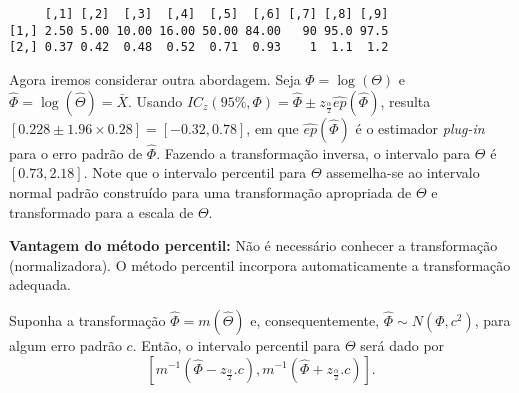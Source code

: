 \documentclass[
  letterpaper,
  DIV=11,
  numbers=noendperiod]{scrreprt}
\begin{document}
\begin{verbatim}
     [,1] [,2]  [,3]  [,4]  [,5]  [,6] [,7] [,8] [,9]
[1,] 2.50 5.00 10.00 16.00 50.00 84.00   90 95.0 97.5
[2,] 0.37 0.42  0.48  0.52  0.71  0.93    1  1.1  1.2
\end{verbatim}

Agora iremos considerar outra abordagem. Seja \(\Phi=\log(\Theta)\) e
\(\hat\Phi=\log(\hat\Theta)=\bar{X}\). Usando
\(IC_z\left(95\%,\Phi \right)= \hat{\Phi} \pm z_{\frac{\alpha}{2}}\hat{ep}(\hat{\Phi})\),
resulta
\(\left[ 0.228 \pm 1.96 \times 0.28 \right]=\left[-0.32, 0.78\right]\),
em que \(\hat{ep}(\hat{\Phi})\) é o estimador \textit{plug-in} para o
erro padrão de \(\hat\Phi\). Fazendo a transformação inversa, o
intervalo para \(\Theta\) é \(\left[0.73, 2.18\right]\). Note que o
intervalo percentil para \(\Theta\) assemelha-se ao intervalo normal
padrão construído para uma transformação apropriada de \(\Theta\) e
transformado para a escala de \(\Theta\).

\begin{tcolorbox}[enhanced jigsaw, coltitle=black, bottomtitle=1mm, toprule=.15mm, arc=.35mm, colframe=quarto-callout-important-color-frame, breakable, opacityback=0, bottomrule=.15mm, rightrule=.15mm, titlerule=0mm, toptitle=1mm, title=\textcolor{quarto-callout-important-color}{\faExclamation}\hspace{0.5em}{Importante}, leftrule=.75mm, opacitybacktitle=0.6, left=2mm, colback=white, colbacktitle=quarto-callout-important-color!10!white]

\textbf{Vantagem do método percentil:} Não é necessário conhecer a
transformação (normalizadora). O método percentil incorpora
automaticamente a transformação adequada.

\end{tcolorbox}

\begin{tcolorbox}[enhanced jigsaw, coltitle=black, bottomtitle=1mm, toprule=.15mm, arc=.35mm, colframe=quarto-callout-caution-color-frame, breakable, opacityback=0, bottomrule=.15mm, rightrule=.15mm, titlerule=0mm, toptitle=1mm, title=\textcolor{quarto-callout-caution-color}{\faFire}\hspace{0.5em}{Lema}, leftrule=.75mm, opacitybacktitle=0.6, left=2mm, colback=white, colbacktitle=quarto-callout-caution-color!10!white]

Suponha a transformação \(\hat\Phi=m(\hat\Theta)\) e, consequentemente,
\(\hat\Phi\sim N(\Phi,c^2)\), para algum erro padrão \(c\). Então, o
intervalo percentil para \(\Theta\) será dado por
\[\left[ m^{-1}(\hat\Phi -z_{\frac{\alpha}{2}}.c), m^{-1}(\hat\Phi +z_{\frac{\alpha}{2}}.c)\right].\]

\end{tcolorbox}
\end{document}

